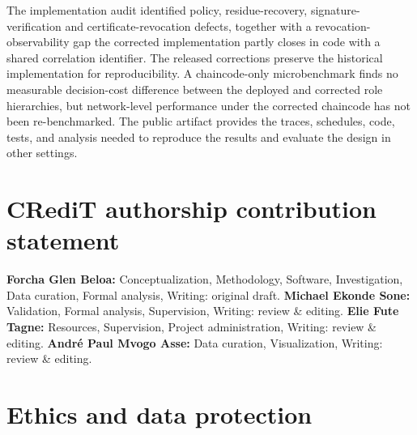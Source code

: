 \documentclass[a4paper,fleqn]{cas-dc}
\begin{document}
The implementation audit identified policy, residue-recovery,
signature-verification and certificate-revocation defects, together with a
revocation-observability gap the corrected implementation partly closes in code with a
shared correlation identifier. The released corrections preserve the
historical implementation for reproducibility. A chaincode-only
microbenchmark finds no measurable decision-cost difference between the
deployed and corrected role hierarchies, but network-level performance
under the corrected chaincode has not been re-benchmarked. The public
artifact provides the traces, schedules, code, tests, and analysis needed
to reproduce the results and evaluate the design in other settings.

\section*{CRediT authorship contribution statement}

\textbf{Forcha Glen Beloa:} Conceptualization, Methodology, Software,
Investigation, Data curation, Formal analysis, Writing: original draft.
\textbf{Michael Ekonde Sone:} Validation, Formal analysis, Supervision,
Writing: review \& editing. \textbf{Elie Fute Tagne:} Resources,
Supervision, Project administration, Writing: review \& editing.
\textbf{Andr\'{e} Paul Mvogo Asse:} Data curation, Visualization,
Writing: review \& editing.

\section*{Ethics and data protection}
\end{document}
